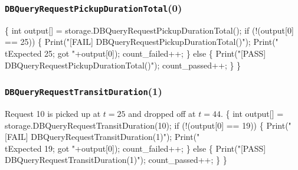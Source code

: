 \documentclass{article}
\def\nwendcode{\endtrivlist \endgroup}
\let\nwdocspar=\par
\begin{document}
\subsubsection{{\tt{}DBQueryRequestPickupDurationTotal}(0)}
\nwenddocs{}\endmoddef{}
\{
  int output[] = storage.DBQueryRequestPickupDurationTotal();
  if (!(output[0] == 25)) \{
    Print("[FAIL] DBQueryRequestPickupDurationTotal()");
    Print("\\tExpected 25; got "+output[0]);
    count_failed++;
  \} else \{
    Print("[PASS] DBQueryRequestPickupDurationTotal()");
    count_passed++;
  \}
\}
\nwendcode{}\nwdocspar
\subsubsection{{\tt{}DBQueryRequestTransitDuration}(1)}
Request 10 is picked up at $t=25$ and dropped off at $t=44$.
\nwenddocs{}\endmoddef{}
\{
  int output[] = storage.DBQueryRequestTransitDuration(10);
  if (!(output[0] == 19)) \{
    Print("[FAIL] DBQueryRequestTransitDuration(1)");
    Print("\\tExpected 19; got "+output[0]);
    count_failed++;
  \} else \{
    Print("[PASS] DBQueryRequestTransitDuration(1)");
    count_passed++;
  \}
\}
\nwendcode{}\nwdocspar
\end{document}
